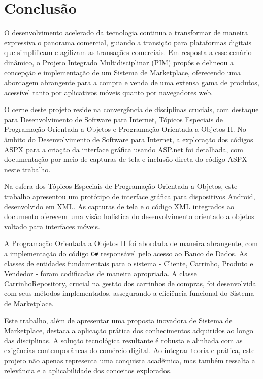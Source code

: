 \documentclass[
	12pt,				%
	openright,			%
	twoside,			%
	a4paper,			%
	english,			%
	brazil				%
	]{abntex2}
\begin{document}
\chapter{Conclusão}\label{cap_conclusao}

O desenvolvimento acelerado da tecnologia continua a transformar de maneira expressiva o panorama comercial, guiando a transição para plataformas digitais que simplificam e agilizam as transações comerciais. Em resposta a esse cenário dinâmico, o Projeto Integrado Multidisciplinar (PIM) propôs e delineou a concepção e implementação de um Sistema de Marketplace, oferecendo uma abordagem abrangente para a compra e venda de uma extensa gama de produtos, acessível tanto por aplicativos móveis quanto por navegadores web.

O cerne deste projeto reside na convergência de disciplinas cruciais, com destaque para Desenvolvimento de Software para Internet, Tópicos Especiais de Programação Orientada a Objetos e Programação Orientada a Objetos II. No âmbito do Desenvolvimento de Software para Internet, a exploração dos códigos ASPX para a criação da interface gráfica usando ASP.net foi detalhada, com documentação por meio de capturas de tela e inclusão direta do código ASPX neste trabalho.

Na esfera dos Tópicos Especiais de Programação Orientada a Objetos, este trabalho apresentou um protótipo de interface gráfica para dispositivos Android, desenvolvido em XML. As capturas de tela e o código XML integrados ao documento oferecem uma visão holística do desenvolvimento orientado a objetos voltado para interfaces móveis.

A Programação Orientada a Objetos II foi abordada de maneira abrangente, com a implementação do código \texttt{C\#} responsável pelo acesso ao Banco de Dados. As classes de entidades fundamentais para o sistema - Cliente, Carrinho, Produto e Vendedor - foram codificadas de maneira apropriada. A classe CarrinhoRepository, crucial na gestão dos carrinhos de compras, foi desenvolvida com seus métodos implementados, assegurando a eficiência funcional do Sistema de Marketplace.

Este trabalho, além de apresentar uma proposta inovadora de Sistema de Marketplace, destaca a aplicação prática dos conhecimentos adquiridos ao longo das disciplinas. A solução tecnológica resultante é robusta e alinhada com as exigências contemporâneas do comércio digital. Ao integrar teoria e prática, este projeto não apenas representa uma conquista acadêmica, mas também ressalta a relevância e a aplicabilidade dos conceitos explorados.
\end{document}
